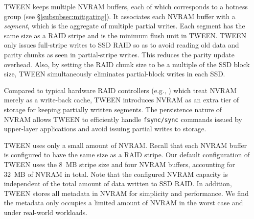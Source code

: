 
TWEEN keeps multiple NVRAM buffers, each of which corresponds to a hotness
group (see \S\ref{subsubsec:mitigating}). It associates each NVRAM buffer with
a \textit{segment}, which is the aggregate of multiple partial writes.  Each
segment has the same size as a RAID stripe and is the minimum flush unit in
TWEEN.  TWEEN only issues full-stripe writes to SSD RAID so as to avoid
reading old data and parity chunks as seen in partial-stripe writes.  This reduces the
parity update overhead.  Also, by setting the RAID chunk size to be a multiple
of the SSD block size, TWEEN simultaneously eliminates partial-block writes in
each SSD. 


Compared to typical hardware RAID controllers (e.g., \cite{dell,lsi}) which
treat NVRAM merely as a write-back cache, TWEEN introduces NVRAM as an extra
tier of storage for keeping partially written segments.  The persistence
nature of NVRAM allows TWEEN to efficiently handle \texttt{fsync/sync}
commands issued by upper-layer applications and avoid issuing partial writes
to storage. 


TWEEN uses only a small amount of NVRAM.  Recall that each NVRAM buffer is
configured to have the same size as a RAID stripe.  Our default configuration
of TWEEN uses the \SI{8}{MB} stripe size and four NVRAM buffers, accounting for
\SI{32}{MB} of NVRAM in total.  Note that the configured NVRAM capacity is
independent of the total amount of data written to SSD RAID.  In addition,
TWEEN stores all metadata in NVRAM for simplicity and performance. We find 
the metadata only occupies a limited amount of NVRAM in the worst case and
under real-world workloads. 

